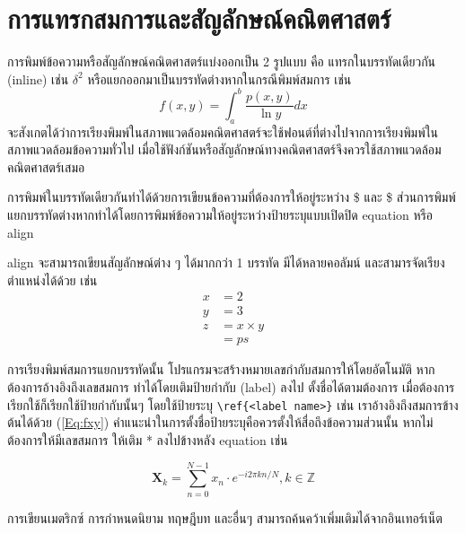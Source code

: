 \chapter{การแทรกสมการและสัญลักษณ์คณิตศาสตร์}
การพิมพ์ข้อความหรือสัญลักษณ์คณิตศาสตร์แบ่งออกเป็น 2 รูปแบบ คือ แทรกในบรรทัดเดียวกัน (inline) เช่น $\delta^2$ หรือแยกออกมาเป็นบรรทัดต่างหากในกรณีพิมพ์สมการ เช่น
\begin{equation}
	f(x,y) = \int_a^b \frac{p(x,y)}{\ln y} dx \label{Eq:fxy}
\end{equation}
จะสังเกตได้ว่าการเรียงพิมพ์ในสภาพแวดล้อมคณิตศาสตร์จะใช้ฟอนต์ที่ต่างไปจากการเรียงพิมพ์ในสภาพแวดล้อมข้อความทั่วไป เมื่อใช้ฟังก์ชันหรือสัญลักษณ์ทางคณิตศาสตร์จึงควรใช้สภาพแวดล้อมคณิตศาสตร์เสมอ

การพิมพ์ในบรรทัดเดียวกันทำได้ด้วยการเขียนข้อความที่ต้องการให้อยู่ระหว่าง \$ และ \$ ส่วนการพิมพ์แยกบรรทัดต่างหากทำได้โดยการพิมพ์ข้อความให้อยู่ระหว่างป้ายระบุแบบเปิดปิด equation หรือ align

align จะสามารถเขียนสัญลักษณ์ต่าง ๆ ได้มากกว่า 1 บรรทัด มีได้หลายคอลัมน์ และสามารจัดเรียงตำแหน่งได้ด้วย เช่น
\begin{align}
	x    &= 2 \label{Eq:x} \\
	y    &= 3 \label{Eq:y} \\
	z    &= x \times y \nonumber \\
	&= p \label{Eq:result}s
\end{align}

การเรียงพิมพ์สมการแยกบรรทัดนั้น โปรแกรมจะสร้างหมายเลขกำกับสมการให้โดยอัตโนมัติ หากต้องการอ้างอิงถึงเลขสมการ ทำได้โดยเติมป้ายกำกับ (label) ลงไป ตั้งชื่อได้ตามต้องการ เมื่อต้องการเรียกใช้ก็เรียกใช้ป้ายกำกับนั้นๆ โดยใช้ป้ายระบุ \lstinline|\ref{<label name>}| เช่น เราอ้างอิงถึงสมการข้างต้นได้ด้วย (\ref{Eq:fxy}) คำแนะนำในการตั้งชื่อป้ายระบุคือควรตั้งให้สื่อถึงข้อความส่วนนั้น
หากไม่ต้องการให้มีเลขสมการ ให้เติม * ลงไปข้างหลัง equation เช่น

\begin{equation*}
	\mathbf{X}_k = \sum_{n=0}^{N-1} x_n \cdot e^{-i 2 \pi k n / N}, k \in \mathbb{Z}
\end{equation*}

การเขียนเมตริกซ์ การกำหนดนิยาม ทฤษฎีบท และอื่นๆ สามารถค้นคว้าเพิ่มเติมได้จากอินเทอร์เน็ต